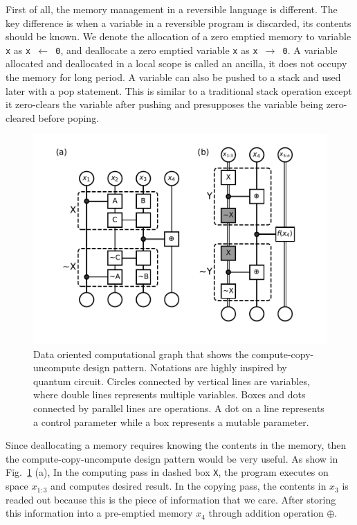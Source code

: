 \documentclass[aps,twocolumn,longbibliography,english,superscriptaddress]{revtex4-1}
\newcommand{\<}{\langle}
\renewcommand{\>}{\rangle}
\newcommand{\Fig}[1]{Fig.~\ref{#1}}
\theoremstyle{definition}\newtheorem{definition}{\textit{Definition}}
\begin{document}
    First of all, the memory management in a reversible language is different.
    The key difference is when a variable in a reversible program is discarded, its contents should be known.
    We denote the allocation of a zero emptied memory to variable \texttt{x} as \texttt{x $\leftarrow$ 0}, and deallocate a zero emptied variable \texttt{x} as \texttt{x $\rightarrow$ 0}.
    A variable allocated and deallocated in a local scope is called an ancilla, it does not occupy the memory for long period.
    A variable can also be pushed to a stack and used later with a pop statement. This is similar to a traditional stack operation except it zero-clears the variable after pushing and presupposes the variable being zero-cleared before poping.
\begin{figure}
    \centerline{\includegraphics[width=\columnwidth,trim={0 1cm 0 0cm},clip]{images/fig6.pdf}}
    \caption{Data oriented computational graph that shows the compute-copy-uncompute design pattern. Notations are highly inspired by quantum circuit. Circles connected by vertical lines are variables, where double lines represents multiple variables. Boxes and dots connected by parallel lines are operations. A dot on a line represents a control parameter while a box represents a mutable parameter.
    }\label{fig:ccu}
\end{figure}
Since deallocating a memory requires knowing the contents in the memory, then the compute-copy-uncompute design pattern would be very useful.
As show in \Fig{fig:ccu} (a), In the computing pass in dashed box \texttt{X}, the program executes on space $x_{1\colon 3}$ and computes desired result. In the copying pass, the contents in $x_3$ is readed out because this is the piece of information that we care. After storing this information into a pre-emptied memory $x_4$ through addition operation $\oplus$.
\end{document}
